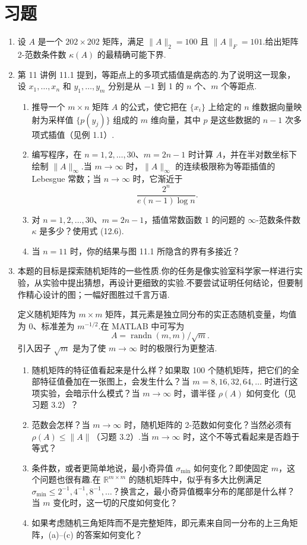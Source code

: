 \documentclass[UTF8,fontset=none,12pt]{ctexart}
\theoremstyle{definition}
\begin{document}
\section*{习题}

\begin{enumerate}[label=\textbf{12.\arabic*}]
    \item 设 $A$ 是一个 $202\times202$ 矩阵，满足 $\|A\|_2=100$ 且 $\|A\|_F=101$.给出矩阵 2-范数条件数 $\kappa(A)$ 的最精确可能下界.

    \item 第 11 讲例 11.1 提到，等距点上的多项式插值是病态的.为了说明这一现象，设 $x_1,\ldots,x_n$ 和 $y_1,\ldots,y_m$ 分别是从 $-1$ 到 1 的 $n$ 个、$m$ 个等距点.
    \begin{enumerate}[label=(\alph*)]
        \item 推导一个 $m\times n$ 矩阵 $A$ 的公式，使它把在 $\{x_i\}$ 上给定的 $n$ 维数据向量映射为采样值 $\{p(y_j)\}$ 组成的 $m$ 维向量，其中 $p$ 是这些数据的 $n-1$ 次多项式插值（见例 1.1）.
        \item 编写程序，在 $n=1,2,\ldots,30$、$m=2n-1$ 时计算 $A$，并在半对数坐标下绘制 $\|A\|_\infty$.当 $m\to\infty$ 时，$\|A\|_\infty$ 的连续极限称为等距插值的 Lebesgue 常数；当 $n\to\infty$ 时，它渐近于
        \[
            \frac{2^n}{e(n-1)\log n}.
        \]
        \item 对 $n=1,2,\ldots,30$、$m=2n-1$，插值常数函数 1 的问题的 $\infty$-范数条件数 $\kappa$ 是多少？使用式 (12.6).
        \item 当 $n=11$ 时，你的结果与图 11.1 所隐含的界有多接近？
    \end{enumerate}

    \item 本题的目标是探索随机矩阵的一些性质.你的任务是像实验室科学家一样进行实验，从实验中提出猜想，再设计更细致的实验.不要尝试证明任何结论，但要制作精心设计的图；一幅好图胜过千言万语.

    定义随机矩阵为 $m\times m$ 矩阵，其元素是独立同分布的实正态随机变量，均值为 0、标准差为 $m^{-1/2}$.在 MATLAB 中可写为
    \[
        A=\operatorname{randn}(m,m)/\sqrt m.
    \]
    引入因子 $\sqrt m$ 是为了使 $m\to\infty$ 时的极限行为更整洁.
    \begin{enumerate}[label=(\alph*)]
        \item 随机矩阵的特征值看起来是什么样？如果取 100 个随机矩阵，把它们的全部特征值叠加在一张图上，会发生什么？当 $m=8,16,32,64,\ldots$ 时进行这项实验，会暗示什么模式？当 $m\to\infty$ 时，谱半径 $\rho(A)$ 如何变化（见习题 3.2）？
        \item 范数会怎样？当 $m\to\infty$ 时，随机矩阵的 2-范数如何变化？当然必须有 $\rho(A)\le\|A\|$（习题 3.2）.当 $m\to\infty$ 时，这个不等式看起来是否趋于等式？
        \item 条件数，或者更简单地说，最小奇异值 $\sigma_{\min}$ 如何变化？即使固定 $m$，这个问题也很有趣.在 $\mathbb R^{m\times m}$ 的随机矩阵中，似乎有多大比例满足 $\sigma_{\min}\le2^{-1},4^{-1},8^{-1},\ldots$？换言之，最小奇异值概率分布的尾部是什么样？当 $m$ 变化时，这一切的尺度如何变化？
        \item 如果考虑随机三角矩阵而不是完整矩阵，即元素来自同一分布的上三角矩阵，(a)--(c) 的答案如何变化？
    \end{enumerate}
\end{enumerate}
\end{document}
